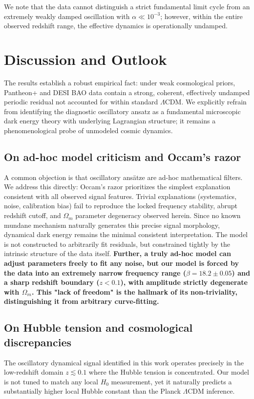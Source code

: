 \documentclass[10pt,a4paper]{article}
\begin{document}
We note that the data cannot distinguish a strict fundamental limit cycle from an extremely weakly damped oscillation with $\alpha\ll 10^{-3}$;
however, within the entire observed redshift range, the effective dynamics is operationally undamped.

\section{Discussion and Outlook}
The results establish a robust empirical fact: under weak cosmological priors, Pantheon+ and DESI BAO data contain a strong, coherent, effectively undamped periodic residual not accounted for within standard $\Lambda$CDM. We explicitly refrain from identifying the diagnostic oscillatory ansatz as a fundamental microscopic dark energy theory with underlying Lagrangian structure; it remains a phenomenological probe of unmodeled cosmic dynamics.

\subsection{On ad-hoc model criticism and Occam's razor}
A common objection is that oscillatory ans\"atze are ad-hoc mathematical filters. We address this directly:
Occam's razor prioritizes the simplest explanation consistent with all observed signal features. Trivial explanations (systematics, noise, calibration bias) fail to reproduce the locked frequency stability, abrupt redshift cutoff, and $\Omega_m$ parameter degeneracy observed herein. Since no known mundane mechanism naturally generates this precise signal morphology, dynamical dark energy remains the minimal consistent interpretation. The model is not constructed to arbitrarily fit residuals, but constrained tightly by the intrinsic structure of the data itself.
\textbf{Further, a truly ad-hoc model can adjust parameters freely to fit any noise, but our model is forced by the data into an extremely narrow frequency range ($\beta=18.2\pm0.05$) and a sharp redshift boundary ($z<0.1$), with amplitude strictly degenerate with $\Omega_m$. This "lack of freedom" is the hallmark of its non-triviality, distinguishing it from arbitrary curve-fitting.}

\subsection{On Hubble tension and cosmological discrepancies}
The oscillatory dynamical signal identified in this work operates precisely in the low-redshift domain $z\lesssim 0.1$ where the Hubble tension is concentrated. Our model is not tuned to match any local $H_0$ measurement, yet it naturally predicts a substantially higher local Hubble constant than the Planck $\Lambda$CDM inference.
\end{document}
